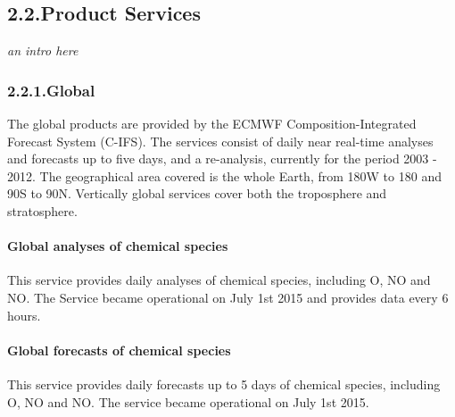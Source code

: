 \documentclass[9pt]{report}
\begin{document}
\subsection{2.2.\hspace*{0.5em}Product Services}\label{sec-product-services}%

\noindent{}\emph{an intro here}%

\subsubsection{2.2.1.\hspace*{0.5em}Global}\label{sec-global}%

\noindent{}The global products are provided by the ECMWF Composition-Integrated Forecast System (C-IFS).
The services consist of daily near real-time analyses and forecasts up to five days, and a re-analysis, currently for the period 2003 - 2012. 
The geographical area covered is the whole Earth, from 180\textdegree{}W to 180\textdegree{} and 90\textdegree{}S to 90\textdegree{}N. 
Vertically global services cover both the troposphere and stratosphere.%

\paragraph{Global analyses of chemical species}\label{sec-global-analyses-of-chemical-species}%

\noindent{}\mdbr
{}This service provides daily analyses of chemical species, including O, NO and NO. 
The Service became operational on July 1st 2015 and provides data every 6 hours.%

\paragraph{Global forecasts of chemical species}\label{sec-global-forecasts-of-chemical-species}%

\noindent{}\mdbr
{}This service provides daily forecasts up to 5 days of chemical species, including O, NO and NO. 
The service became operational on July 1st 2015.%
\end{document}
